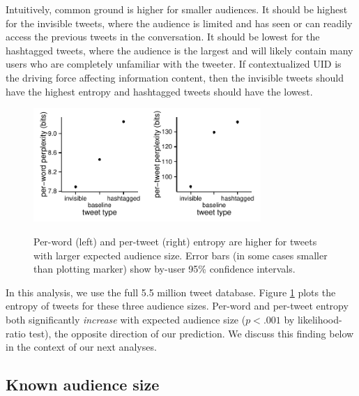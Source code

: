 \documentclass[11pt,letterpaper]{article}
\begin{document}
Intuitively, common ground is higher for smaller audiences. It should be highest for the invisible tweets, where the audience is limited and has seen or can readily access the previous tweets in the conversation.  It should be lowest for the hashtagged tweets, where the audience is the largest and will likely contain many users who are completely unfamiliar with the tweeter.  If contextualized UID is the driving force affecting information content, then the invisible tweets should have the highest entropy and hashtagged tweets should have the lowest.

\begin{figure}
 \centering \includegraphics[width=1.7in]{figures/cmcl-audience-pw.pdf}\includegraphics[width=1.7in]{figures/cmcl-audience-pt.pdf}
 \caption{\label{fig:audience} Per-word (left) and per-tweet (right) entropy are higher for tweets with larger expected audience size. Error bars (in some cases smaller than plotting marker) show by-user 95\% confidence intervals.}
\vspace*{-.5em}
\end{figure}

In this analysis, we use the full 5.5 million tweet database. Figure \ref{fig:audience} plots the entropy of tweets for these three audience sizes.  Per-word and per-tweet entropy both significantly {\it increase} with expected audience size ($p < .001$ by likelihood-ratio test), the opposite direction of our prediction. We discuss this finding below in the context of our next analyses. 


\subsection{Known audience size}
\end{document}
